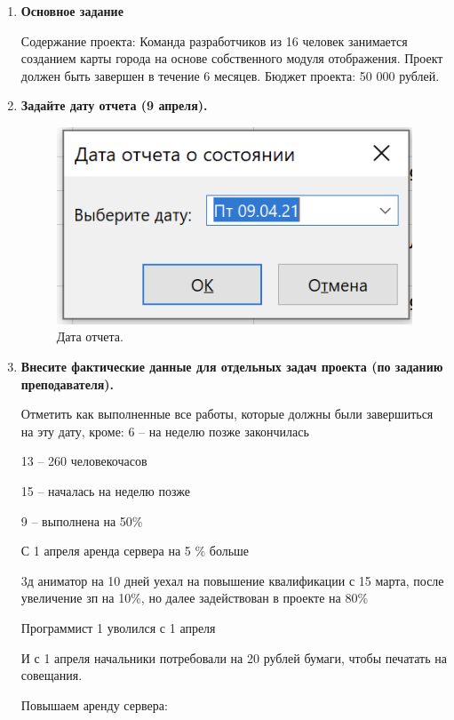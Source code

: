 \documentclass[a4paper,14pt]{extreport} %
\begin{document}
\begin{enumerate}

\item \textbf{Основное задание}

Содержание проекта: Команда разработчиков из 16 человек занимается созданием карты города на основе собственного модуля отображения. Проект должен быть завершен в течение 6 месяцев. Бюджет проекта: 50 000 рублей.

\item \textbf{Задайте дату отчета (9 апреля).}

\begin{figure}[H]
  \centering
  \caption{Дата отчета. }
  \includegraphics[scale=1]{1}
\end{figure}

\item \textbf{Внесите фактические данные для отдельных задач проекта (по заданию преподавателя).}

Отметить как выполненные все работы, которые должны были завершиться на эту дату, кроме:
6 -- на неделю позже закончилась

13 -- 260 человекочасов

15 -- началась на неделю позже

9 -- выполнена на 50\%

С 1 апреля аренда сервера на 5 \% больше

3д аниматор на 10 дней уехал на повышение квалификации с 15 марта, после увеличение зп на 10\%, но далее задействован в проекте на 80\%

Программист 1 уволился с 1 апреля

И с 1 апреля начальники потребовали на 20 рублей бумаги, чтобы печатать на совещания.

\newpage

Повышаем аренду сервера:


\end{enumerate}
\end{document}
